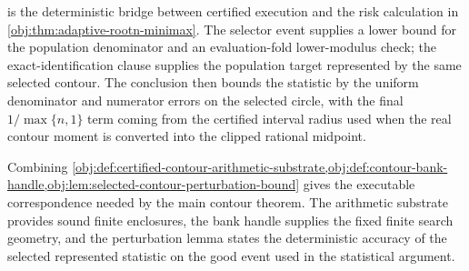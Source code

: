  is the deterministic bridge between certified execution and the risk calculation in \cref{obj:thm:adaptive-rootn-minimax}. The selector event supplies a lower bound for the population denominator and an evaluation-fold lower-modulus check; the exact-identification clause supplies the population target represented by the same selected contour. The conclusion then bounds the statistic by the uniform denominator and numerator errors on the selected circle, with the final \(1/\max\{n,1\}\) term coming from the certified interval radius used when the real contour moment is converted into the clipped rational midpoint.

Combining \cref{obj:def:certified-contour-arithmetic-substrate,obj:def:contour-bank-handle,obj:lem:selected-contour-perturbation-bound} gives the executable correspondence needed by the main contour theorem. The arithmetic substrate provides sound finite enclosures, the bank handle supplies the fixed finite search geometry, and the perturbation lemma states the deterministic accuracy of the selected represented statistic on the good event used in the statistical argument.
